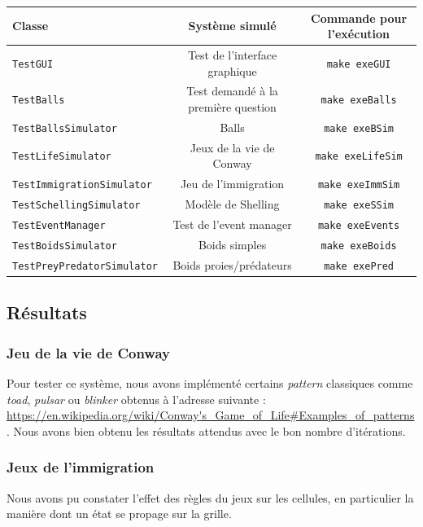 \documentclass [a4paper,11pt,titlepage] {article}
\begin{document}
\begin{center}
\begin{tabular}{|l|c|c|}
  \hline
    Classe & Système simulé & Commande pour l'exécution \\
  \hline
  \texttt{TestGUI} & Test de l'interface graphique & \texttt{make exeGUI}\\
  \hline
   \texttt{TestBalls} & Test demandé à la première question & \texttt{make exeBalls}\\
  \hline
  \texttt{TestBallsSimulator} & Balls & \texttt{make exeBSim}\\
  \hline
  \texttt{TestLifeSimulator} & Jeux de la vie de Conway & \texttt{make exeLifeSim}\\
  \hline
  \texttt{TestImmigrationSimulator} & Jeu de l'immigration & \texttt{make exeImmSim}\\
  \hline
  \texttt{TestSchellingSimulator} & Modèle de Shelling & \texttt{make exeSSim}\\
  \hline
  \texttt{TestEventManager} & Test de l'event manager & \texttt{make exeEvents}\\
  \hline
  \texttt{TestBoidsSimulator} & Boids simples & \texttt{make exeBoids}\\
  \hline
  \texttt{TestPreyPredatorSimulator} & Boids proies/prédateurs  & \texttt{make exePred}\\
  \hline

\end{tabular}
\end{center}

\subsection {Résultats}
\subsubsection {Jeu de la vie de Conway}
Pour tester ce système, nous avons implémenté certains \textit{pattern} classiques comme \textit{toad}, \textit{pulsar} ou \textit{blinker} obtenus à l'adresse suivante : \url{https://en.wikipedia.org/wiki/Conway's_Game_of_Life#Examples_of_patterns}.
\newline
Nous avons bien obtenu les résultats attendus avec le bon nombre d'itérations.

\subsubsection {Jeux de l'immigration}
Nous avons pu constater l'effet des règles du jeux sur les cellules, en particulier la manière dont un état se propage sur la grille.
\end{document}

